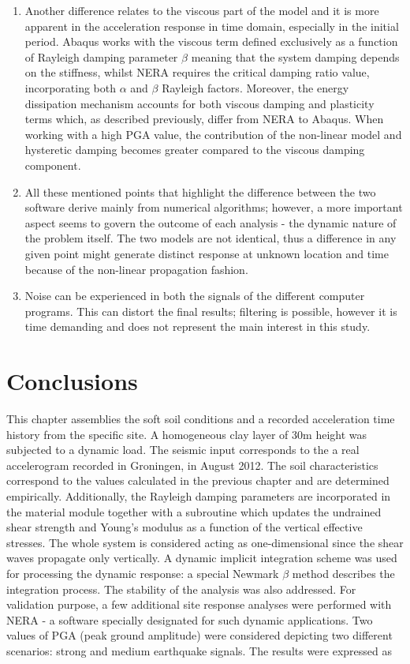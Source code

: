 \begin{enumerate}
		\item Another difference relates to the viscous part of the model and it is more apparent in the acceleration response in time domain, especially in the initial period. Abaqus works with the viscous term defined exclusively as a function of Rayleigh damping parameter $\beta$ meaning that the system damping depends on the stiffness, whilst NERA requires the critical damping ratio value, incorporating both $\alpha$ and $\beta$ Rayleigh factors. Moreover, the energy dissipation mechanism accounts for both viscous damping and plasticity terms which, as described previously, differ from NERA to Abaqus. When working with a high PGA value, the contribution of the non-linear model and hysteretic damping becomes greater compared to the viscous damping component.
		\item All these mentioned points that highlight the difference between the two software derive mainly from numerical algorithms; however, a more important aspect seems to govern the outcome of each analysis - the dynamic nature of the problem itself. The two models are not identical, thus a difference in any given point might generate distinct response at unknown location and time because of the non-linear propagation fashion. 
		\item Noise can be experienced in both the signals of the different computer programs. This can distort the final results; filtering is possible, however it is time demanding and does not represent the main interest in this study.
	\end{enumerate}
	
	
	\section{Conclusions}
	This chapter assemblies the soft soil conditions and a recorded acceleration time history from the specific site. A homogeneous clay layer of 30m height was subjected to a dynamic load. The seismic input corresponds to the a real accelerogram recorded in Groningen, in August 2012. The soil characteristics correspond to the values calculated in the previous chapter and are determined empirically. Additionally, the Rayleigh damping parameters are incorporated in the material module together with a subroutine which updates the undrained shear strength and Young's modulus as a function of the vertical effective stresses. The whole system is considered acting as one-dimensional since the shear waves propagate only vertically. A dynamic implicit integration scheme was used for processing the dynamic response: a special Newmark $\beta$ method describes the integration process. The stability of the analysis was also addressed. For validation purpose, a few additional site response analyses were performed with NERA - a software specially designated for such dynamic applications. Two values of PGA (peak ground amplitude) were considered depicting two different scenarios: strong and medium earthquake signals. The results were expressed as 
	  

